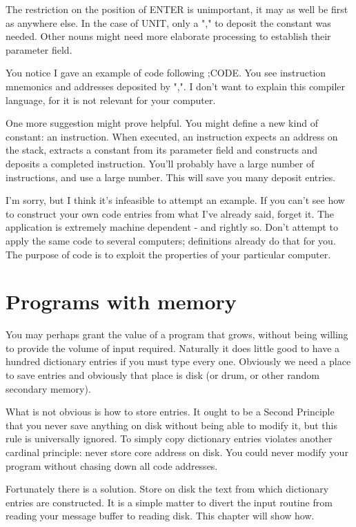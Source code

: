 \documentclass[b5paper, oneside]{book}
\begin{document}
The restriction on the position of ENTER is unimportant, it may as well be first as anywhere else. In the case of UNIT, only a "," to deposit the constant was needed. Other nouns might need more elaborate processing to establish their parameter field.

You notice I gave an example of code following ;CODE. You see instruction mnemonics and addresses deposited by ",". I don't want to explain this compiler language, for it is not relevant for your computer.

One more suggestion might prove helpful. You might define a new kind of constant: an instruction. When executed, an instruction expects an address on the stack, extracts a constant from its parameter field and constructs and deposits a completed instruction. You'll probably have a large number of instructions, and use a large number. This will save you many deposit entries.

I'm sorry, but I think it's infeasible to attempt an example. If you can't see how to construct your own code entries from what I've already said, forget it. The application is extremely machine dependent - and rightly so. Don't attempt to apply the same code to several computers; definitions already do that for you. The purpose of code is to exploit the properties of your particular computer.



\chapter{Programs with memory}
You may perhaps grant the value of a program that grows, without being willing to provide the volume of input required. Naturally it does little good to have a hundred dictionary entries if you must type every one. Obviously we need a place to save entries and obviously that place is disk (or drum, or other random secondary memory).

What is not obvious is how to store entries. It ought to be a Second Principle that you never save anything on disk without being able to modify it, but this rule is universally ignored. To simply copy dictionary entries violates another cardinal principle: never store core address on disk. You could never modify your program without chasing down all code addresses.

Fortunately there is a solution. Store on disk the text from which dictionary entries are constructed. It is a simple matter to divert the input routine from reading your message buffer to reading disk. This chapter will show how.
\end{document}
